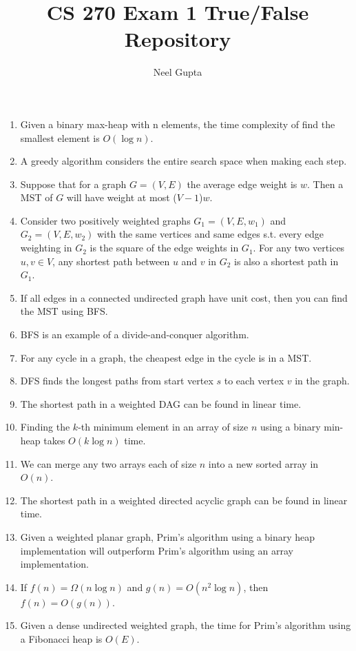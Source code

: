\documentclass[12pt]{article}
\begin{document}
\title{\vspace{-4cm}CS 270 Exam 1 True/False Repository}
\author{Neel Gupta}
\maketitle 

\begin{enumerate}
    \item Given a binary max-heap with n elements, the time complexity of find the smallest element is $O(\log n)$.
    \item A greedy algorithm considers the entire search space when making each step.
    \item Suppose that for a graph $G=(V,E)$ the average edge weight is $w$. Then a MST of $G$ will have weight at most ($V-1$)$w$.
    \item Consider two positively weighted graphs $G_1=(V,E,w_1)$ and $G_2=(V,E,w_2)$ with the same vertices and same edges s.t. every edge weighting in $G_2$ is the square of the edge weights in $G_1$. For any two vertices $u,v\in V$, any shortest path between $u$ and $v$ in $G_2$ is also a shortest path in $G_1$.
    \item If all edges in a connected undirected graph have unit cost, then you can find the MST using BFS.
    \item BFS is an example of a divide-and-conquer algorithm.
    \item For any cycle in a graph, the cheapest edge in the cycle is in a MST.
    \item DFS finds the longest paths from start vertex $s$ to each vertex $v$ in the graph.
    \item The shortest path in a weighted DAG can be found in linear time.
    \item Finding the $k$-th minimum element in an array of size $n$ using a binary min-heap takes $O(k\log n)$ time.
    \item We can merge any two arrays each of size $n$ into a new sorted array in $O(n)$.
    \item The shortest path in a weighted directed acyclic graph can be found in linear time.
    \item Given a weighted planar graph, Prim's algorithm using a binary heap implementation will outperform Prim's algorithm using an array implementation.
    \item If $f(n)=\Omega(n\log n)$ and $g(n)=O(n^2\log n)$, then $f(n)=O(g(n))$.
    \item Given a dense undirected weighted graph, the time for Prim's algorithm using a Fibonacci heap is $O(E)$.

\end{enumerate}
\end{document}
